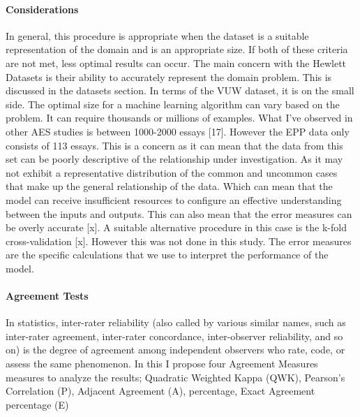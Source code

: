 \paragraph{Considerations} In general, this procedure is appropriate when the dataset is a suitable representation of the domain and is an appropriate size. If both of these criteria are not met, less optimal results can occur. The main concern with the Hewlett Datasets is their ability to accurately represent the domain problem. This is discussed in the datasets section. In terms of the VUW dataset, it is on the small side. The optimal size for a machine learning algorithm can vary based on the problem. It can require thousands or millions of examples. What I’ve observed in other AES studies is between 1000-2000 essays [17]. However the EPP data only consists of 113 essays. This is a concern as it can mean that the data from this set can be poorly descriptive of the relationship under investigation. As it may not exhibit a representative distribution of the common and uncommon cases that make up the general relationship of the data. Which can mean that the model can receive insufficient resources to configure an effective understanding between the inputs and outputs. This can also mean that the error measures can be overly accurate [x]. A suitable alternative procedure in this case is the k-fold cross-validation [x]. However this was not done in this study. The error measures are the specific calculations that we use to interpret the performance of the model. 

\paragraph{Agreement Tests}
In statistics, inter-rater reliability (also called by various similar names, such as inter-rater agreement, inter-rater concordance, inter-observer reliability, and so on) is the degree of agreement among independent observers who rate, code, or assess the same phenomenon. In this I propose four Agreement Measures measures to analyze the results; Quadratic Weighted Kappa (QWK), Pearson’s Correlation (P), Adjacent Agreement (A),  percentage, Exact Agreement percentage (E)

